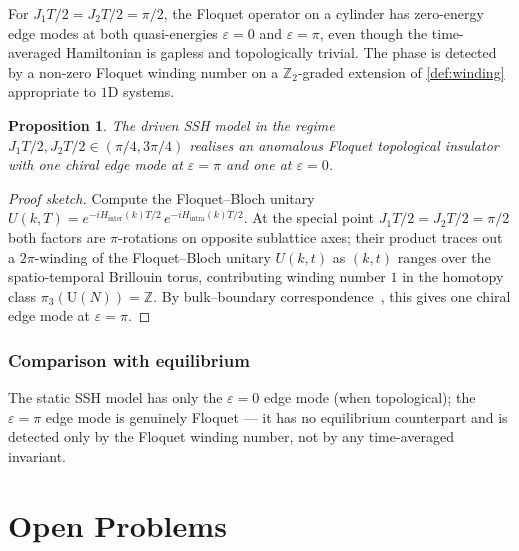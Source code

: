 \documentclass[12pt]{article}
\newtheorem{proposition}[theorem]{Proposition}
\theoremstyle{definition}
\theoremstyle{remark}
\newcommand{\Z}{\mathbb{Z}}
\begin{document}
For $J_1 T/2 = J_2 T/2 = \pi/2$, the Floquet operator on a cylinder has zero-energy edge modes at both quasi-energies $\varepsilon=0$ and $\varepsilon=\pi$, even though the time-averaged Hamiltonian is gapless and topologically trivial. The phase is detected by a non-zero Floquet winding number on a $\Z_2$-graded extension of \cref{def:winding} appropriate to $1$D systems.

\begin{proposition}
\label{prop:driven-ssh}
The driven SSH model in the regime $J_1 T/2,J_2T/2\in(\pi/4,3\pi/4)$ realises an anomalous Floquet topological insulator with one chiral edge mode at $\varepsilon=\pi$ and one at $\varepsilon=0$.
\end{proposition}

\begin{proof}[Proof sketch]
Compute the Floquet--Bloch unitary $U(k,T)=e^{-iH_{\mathrm{inter}}(k)T/2}\,e^{-iH_{\mathrm{intra}}(k)T/2}$. At the special point $J_1T/2=J_2T/2=\pi/2$ both factors are $\pi$-rotations on opposite sublattice axes; their product traces out a $2\pi$-winding of the Floquet--Bloch unitary $U(k,t)$ as $(k,t)$ ranges over the spatio-temporal Brillouin torus, contributing winding number $1$ in the homotopy class $\pi_3(\mathrm{U}(N))=\Z$. By bulk--boundary correspondence~\cite{rudner2020}, this gives one chiral edge mode at $\varepsilon=\pi$.
\end{proof}

\subsubsection{Comparison with equilibrium}

The static SSH model has only the $\varepsilon=0$ edge mode (when topological); the $\varepsilon=\pi$ edge mode is genuinely Floquet --- it has no equilibrium counterpart and is detected only by the Floquet winding number, not by any time-averaged invariant.

\section{Open Problems}
\label{sec:open}
\end{document}
